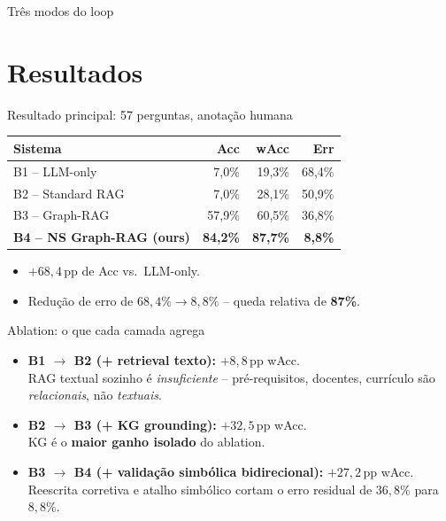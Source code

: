 \documentclass[aspectratio=169]{beamer}
\begin{document}
\begin{frame}{Três modos do loop}
\section{Resultados}

\begin{frame}{Resultado principal: 57 perguntas, anotação humana}
  \begin{table}\centering\small
    \begin{tabular}{lrrr}
      \toprule
      \textbf{Sistema} & \textbf{Acc} & \textbf{wAcc} & \textbf{Err} \\
      \midrule
      B1 -- LLM-only                       & 7,0\%  & 19,3\% & 68,4\% \\
      B2 -- Standard RAG                   & 7,0\%  & 28,1\% & 50,9\% \\
      B3 -- Graph-RAG                      & 57,9\% & 60,5\% & 36,8\% \\
      \textbf{B4 -- NS Graph-RAG (ours)}   & \textbf{84,2\%} & \textbf{87,7\%} & \textbf{8,8\%} \\
      \bottomrule
    \end{tabular}
  \end{table}
  \vspace{0.5em}
  \begin{itemize}
    \item $+68{,}4$\,pp de Acc vs.\ LLM-only.
    \item Redução de erro de $68{,}4\% \to 8{,}8\%$ -- queda relativa de \textbf{87\%}.
  \end{itemize}
\end{frame}

\begin{frame}{Ablation: o que cada camada agrega}
  \begin{itemize}
    \item \textbf{B1 $\to$ B2 (+ retrieval texto):} $+8{,}8$\,pp wAcc.\\
      \small RAG textual sozinho é \emph{insuficiente} -- pré-requisitos, docentes, currículo são \emph{relacionais}, não \emph{textuais}.
    \vspace{0.5em}
    \item \textbf{B2 $\to$ B3 (+ KG grounding):} $+32{,}5$\,pp wAcc.\\
      \small KG é o \textbf{maior ganho isolado} do ablation.
    \vspace{0.5em}
    \item \textbf{B3 $\to$ B4 (+ validação simbólica bidirecional):} $+27{,}2$\,pp wAcc.\\
      \small Reescrita corretiva e atalho simbólico cortam o erro residual de $36{,}8\%$ para $8{,}8\%$.
  \end{itemize}
\end{frame}


\end{frame}
\end{document}
